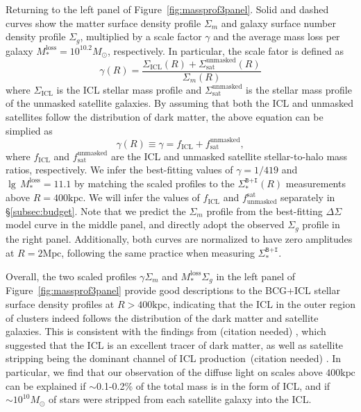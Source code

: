 \documentclass[fleqn,usenatbib]{mnras}
\newcommand{\sigbi}{\Sigma_*^{\texttt{B+I}}}
\newcommand{\sigm}{\Sigma_m}
\newcommand{\sigg}{\Sigma_g}
\newcommand{\mpc}{\mathrm{Mpc}}
\newcommand{\kpc}{\mathrm{kpc}}
\newcommand{\msol}{M_{\odot}}
\newcommand{\ds}{\Delta\Sigma}
\newcommand\xkchen[1]{{\color{cyan} {#1}}}
\newcommand*\citeme{{\color{green}(citation needed)}}
\begin{document}
Returning to the left panel of Figure~\ref{fig:massprof3panel}.  Solid and
dashed curves show the matter surface density profile $\sigm$ and galaxy
surface number density profile $\sigg$, multiplied by a scale factor
$\gamma$ and the average mass loss per galaxy
\xkchen{$M_*^{\mathrm{loss}}=10^{10.2}\msol$}, respectively. In particular, the scale
fator is defined as
\begin{equation}
    \gamma(R) = \frac{\Sigma_{\mathrm{ICL}}(R) +
    \Sigma^{\mathrm{unmasked}}_{\mathrm{sat}}(R)}{\sigm(R)}
    \label{eqn:gamma}
\end{equation}
where $\Sigma_{\mathrm{ICL}}$ is the ICL stellar mass profile and
$\Sigma^{\mathrm{unmasked}}_{\mathrm{sat}}$ is the stellar mass profile of
the unmasked satellite galaxies. By assuming that both the ICL and unmasked
satellites follow the distribution of dark matter, the above equation can
be simplied as
\begin{equation}
    \gamma(R)\equiv \gamma =f_{\mathrm{ICL}} + f^{\mathrm{unmasked}}_{\mathrm{sat}},
    \label{eqn:gamma2}
\end{equation}
where $f_{\mathrm{ICL}}$ and $f^{\mathrm{unmasked}}_{\mathrm{sat}}$ are the
ICL and unmasked satellite stellar-to-halo mass ratios, respectively.  We
infer the best-fitting values of \xkchen{$\gamma=1/419$} and
$\lg\,M_*^{\mathrm{loss}}=11.1$ by matching the scaled profiles to the
$\sigbi(R)$ measurements above $R=400\kpc$.  We will infer the values of
$f_{\mathrm{ICL}}$ and $f_{\mathrm{unmasked}}^{\mathrm{sat}}$ separately in
\S\ref{subsec:budget}.  Note that we predict the $\sigm$ profile from the
best-fitting $\ds$ model curve in the middle panel, and directly adopt the
observed $\sigg$ profile in the right panel.  Additionally, both curves are
normalized to have zero amplitudes at $R{=}2\mpc$, following the same
practice when measuring $\sigbi$.


Overall, the two scaled profiles $\gamma\sigm$ and
$M_*^{\mathrm{loss}}\sigg$ in the left panel of
Figure~\ref{fig:massprof3panel} provide good descriptions to the BCG+ICL
stellar surface density profiles at $R>400\kpc$, indicating that the ICL in
the outer region of clusters indeed follows the distribution of the dark
matter and satellite galaxies. This is consistent with the findings from
\citeme \xkchen{\citep{Montes2019, Zhang2019} }, which suggested that the ICL is an excellent tracer of dark
matter, as well as satellite stripping being the dominant channel of ICL
production~\citeme \xkchen{\citep{Montes2018, JimenezTeja2019, DeMaio2015, DeMaio2018} }. In particular, we find that our observation of the diffuse light on scales above $400\kpc$ can be explained if
$\sim$0.1{-}0.2\% of the total mass is in the form of ICL, and if
${\sim}10^{10}\msol$ of stars were stripped from each satellite galaxy into
the ICL.
\end{document}
